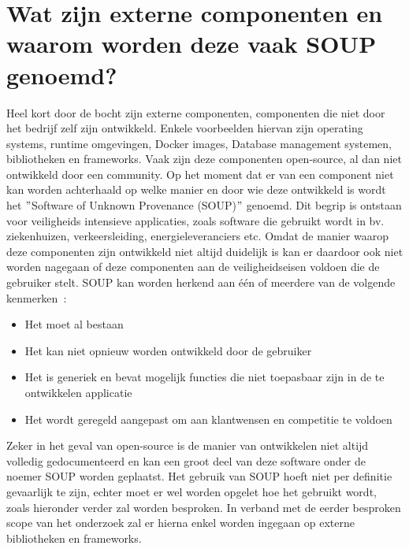 \section{Wat zijn externe componenten en waarom worden deze vaak SOUP genoemd?}\label{sec:watisSOUP}
Heel kort door de bocht zijn externe componenten, componenten die niet door het bedrijf zelf zijn ontwikkeld. Enkele voorbeelden hiervan zijn operating systems, runtime omgevingen, Docker images, Database management systemen, bibliotheken en frameworks. Vaak zijn deze componenten open-source, al dan niet ontwikkeld door een community.
Op het moment dat er van een component niet kan worden achterhaald op welke manier en door wie deze ontwikkeld is wordt het $"$Software of Unknown Provenance (SOUP)$"$ genoemd. Dit begrip is ontstaan voor veiligheids intensieve applicaties, zoals software die gebruikt wordt in bv. ziekenhuizen, verkeersleiding, energieleveranciers etc.
Omdat de manier waarop deze componenten zijn ontwikkeld niet altijd duidelijk is kan er daardoor ook niet worden nagegaan of deze componenten aan de veiligheidseisen voldoen die de gebruiker stelt. SOUP kan worden herkend aan één of meerdere van de volgende kenmerken~\citep{Bischop:2001}:
\begin{itemize}
    \item Het moet al bestaan
    \item Het kan niet opnieuw worden ontwikkeld door de gebruiker
    \item Het is generiek en bevat mogelijk functies die niet toepasbaar zijn in de te ontwikkelen applicatie
    \item Het wordt geregeld aangepast om aan klantwensen en competitie te voldoen
\end{itemize}

Zeker in het geval van open-source is de manier van ontwikkelen niet altijd volledig gedocumenteerd en kan een groot deel van deze software onder de noemer SOUP worden geplaatst. Het gebruik van SOUP hoeft niet per definitie gevaarlijk te zijn, echter moet er wel worden opgelet hoe het gebruikt wordt, zoals hieronder verder zal worden besproken. In verband met de eerder besproken scope van het onderzoek zal er hierna enkel worden ingegaan op externe bibliotheken en frameworks.

